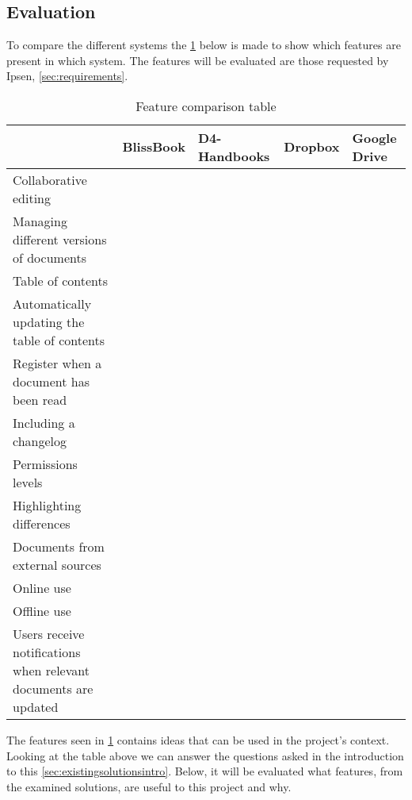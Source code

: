 \subsection{Evaluation}\label{sec:solutionsevaluation}
To compare the different systems the \cref{tab:Exsisting} below is made to show which features are present in which system.
The features will be evaluated are those requested by Ipsen, \cref{sec:requirements}.

\begin{table}[H]
	\begin{center}
		\begin{tabular}{| m{5cm}|m{1.6cm}|m{2cm}|m{1.5cm}|m{1.2cm}|}
			\hline
			& BlissBook  & D4-Handbooks & Dropbox & Google \newline Drive \\
			\hline
			Collaborative editing & \checkmark & & & \checkmark \\
			\hline
			Managing different versions of documents & \checkmark &  &  & \checkmark \\
			\hline
			Table of contents & \checkmark & \checkmark  & & \\
			\hline
			Automatically updating the table of contents & \checkmark & \checkmark  &  & \\
			\hline
			Register when a document has been read & \checkmark & \checkmark &  & \\
			\hline
			Including a changelog & \checkmark & \checkmark  &  & \\
			\hline
			Permissions levels & \checkmark &  & \checkmark & \checkmark \\
			\hline
			Highlighting differences & \checkmark &  &  & \checkmark\\
			\hline
			Documents from external \newline sources &  &  & \checkmark & \checkmark \\
			\hline
			Online use & \checkmark &  \checkmark & \checkmark  & \checkmark \\
			\hline
			Offline use & & \checkmark & \checkmark & \checkmark \\
			\hline
			Users receive notifications when relevant documents are updated & & \checkmark & & \\
			\hline
		\end{tabular}
		\caption{Feature comparison table}\label{tab:Exsisting}
	\end{center}
\end{table}

The features seen in \cref{tab:Exsisting} contains ideas that can be used in the project's context.
Looking at the table above we can answer the questions asked in the introduction to this \cref{sec:existingsolutionsintro}.
Below, it will be evaluated what features, from the examined solutions, are useful to this project and why.

